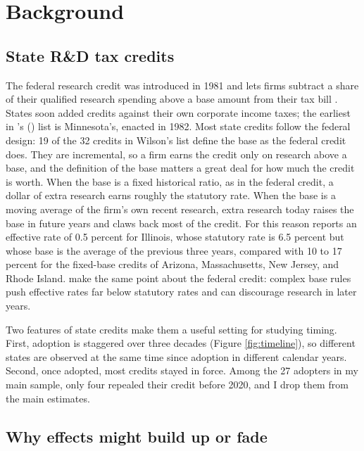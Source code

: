 \documentclass[12pt]{article}
\begin{document}
\section{Background}\label{sec:background}

\subsection{State R\&D tax credits}

The federal research credit was introduced in 1981 and lets firms subtract a share of their qualified research
spending above a base amount from their tax bill \citep{hall1993rd}. States soon added credits against their own
corporate income taxes; the earliest in \citeauthor{wilson2009beggar}'s (\citeyear{wilson2009beggar}) list is
Minnesota's, enacted in 1982. Most state credits follow the federal design: 19 of the 32 credits in Wilson's
list define the base as the federal credit does. They are incremental, so a firm earns the credit only on
research above a base, and the definition of the base matters a great deal for how much the credit is worth. When the base is a fixed historical ratio, as in the federal credit, a dollar of extra
research earns roughly the statutory rate. When the base is a moving average of the firm's own recent
research, extra research today raises the base in future years and claws back most of the credit. For this
reason \citet{wilson2009beggar} reports an effective rate of 0.5 percent for Illinois, whose statutory rate is
6.5 percent but whose base is the average of the previous three years, compared with 10 to 17 percent for
the fixed-base credits of Arizona, Massachusetts, New Jersey, and Rhode Island. \citet{rao2026tax} make the
same point about the federal credit: complex base rules push effective rates far below statutory rates and
can discourage research in later years.

Two features of state credits make them a useful setting for studying timing. First, adoption is staggered
over three decades (Figure \ref{fig:timeline}), so different states are observed at the same time since
adoption in different calendar years. Second, once adopted, most credits stayed in force. Among the 27 adopters in
my main sample, only four repealed their credit before 2020, and I drop them from the main estimates.

\subsection{Why effects might build up or fade}
\end{document}
